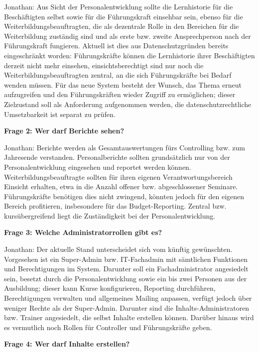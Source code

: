 \documentclass[
    12pt, 
    a4paper,
    ]{scrartcl} %
\begin{document}
Jonathan: Aus Sicht der Personalentwicklung sollte die Lernhistorie f\"ur die Besch\"aftigten selbst sowie f\"ur die F\"uhrungskraft einsehbar sein, ebenso f\"ur die Weiterbildungsbeauftragten, die als dezentrale Rolle in den Bereichen f\"ur die Weiterbildung zust\"andig sind und als erste bzw. zweite Ansprechperson nach der F\"uhrungskraft fungieren. Aktuell ist dies aus Datenschutzgr\"unden bereits eingeschr\"ankt worden: F\"uhrungskr\"afte k\"onnen die Lernhistorie ihrer Besch\"aftigten derzeit nicht mehr einsehen, einsichtsberechtigt sind nur noch die Weiterbildungsbeauftragten zentral, an die sich F\"uhrungskr\"afte bei Bedarf wenden m\"ussen. F\"ur das neue System besteht der Wunsch, das Thema erneut aufzugreifen und den F\"uhrungskr\"aften wieder Zugriff zu erm\"oglichen; dieser Zielzustand soll als Anforderung aufgenommen werden, die datenschutzrechtliche Umsetzbarkeit ist separat zu pr\"ufen.

\medskip
\textbf{Frage 2: Wer darf Berichte sehen?}

Jonathan: Berichte werden als Gesamtauswertungen f\"urs Controlling bzw. zum Jahresende verstanden. Personalberichte sollten grunds\"atzlich nur von der Personalentwicklung eingesehen und reportet werden k\"onnen. Weiterbildungsbeauftragte sollten f\"ur ihren eigenen Verantwortungsbereich Einsicht erhalten, etwa in die Anzahl offener bzw. abgeschlossener Seminare. F\"uhrungskr\"afte ben\"otigen dies nicht zwingend, k\"onnten jedoch f\"ur den eigenen Bereich profitieren, insbesondere f\"ur das Budget-Reporting. Zentral bzw. kurs\"ubergreifend liegt die Zust\"andigkeit bei der Personalentwicklung.

\medskip
\textbf{Frage 3: Welche Administratorrollen gibt es?}

Jonathan: Der aktuelle Stand unterscheidet sich vom k\"unftig gew\"unschten. Vorgesehen ist ein Super-Admin bzw. IT-Fachadmin mit s\"amtlichen Funktionen und Berechtigungen im System. Darunter soll ein Fachadministrator angesiedelt sein, besetzt durch die Personalentwicklung sowie ein bis zwei Personen aus der Ausbildung; dieser kann Kurse konfigurieren, Reporting durchf\"uhren, Berechtigungen verwalten und allgemeines Mailing anpassen, verf\"ugt jedoch \"uber weniger Rechte als der Super-Admin. Darunter sind die Inhalts-Administratoren bzw. Trainer angesiedelt, die selbst Inhalte erstellen k\"onnen. Dar\"uber hinaus wird es vermutlich noch Rollen f\"ur Controller und F\"uhrungskr\"afte geben.

\medskip
\textbf{Frage 4: Wer darf Inhalte erstellen?}
\end{document}
